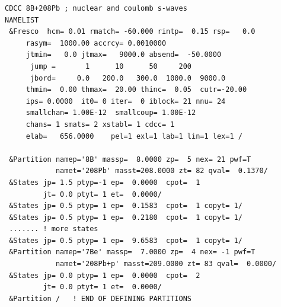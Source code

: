 \documentclass[11pt]{book}
\begin{document}
\begin{small} 
\begin{lstlisting}[frame=single]
CDCC 8B+208Pb ; nuclear and coulomb s-waves                                                    
NAMELIST
 &Fresco  hcm= 0.01 rmatch= -60.000 rintp=  0.15 rsp=   0.0
     rasym=  1000.00 accrcy= 0.0010000 
     jtmin=   0.0 jtmax=   9000.0 absend=  -50.0000 
      jump =       1      10      50     200     
      jbord=     0.0   200.0   300.0  1000.0  9000.0   
     thmin=  0.00 thmax=  20.00 thinc=  0.05  cutr=-20.00
     ips= 0.0000  it0= 0 iter=  0 iblock= 21 nnu= 24
     smallchan= 1.00E-12  smallcoup= 1.00E-12
     chans= 1 smats= 2 xstabl= 1 cdcc= 1
     elab=   656.0000    pel=1 exl=1 lab=1 lin=1 lex=1 /

 &Partition namep='8B' massp=  8.0000 zp=  5 nex= 21 pwf=T                
            namet='208Pb' masst=208.0000 zt= 82 qval=  0.1370/               
 &States jp= 1.5 ptyp=-1 ep=  0.0000  cpot=  1                                  
         jt= 0.0 ptyt= 1 et=  0.0000/                                           
 &States jp= 0.5 ptyp= 1 ep=  0.1583  cpot=  1 copyt= 1/                                                              
 &States jp= 0.5 ptyp= 1 ep=  0.2180  cpot=  1 copyt= 1/                                                              
 ....... ! more states
 &States jp= 0.5 ptyp= 1 ep=  9.6583  cpot=  1 copyt= 1/                                                              
 &Partition namep='7Be' massp=  7.0000 zp=  4 nex= -1 pwf=T                
            namet='208Pb+p' masst=209.0000 zt= 83 qval=  0.0000/               
 &States jp= 0.0 ptyp= 1 ep=  0.0000  cpot=  2                                  
         jt= 0.0 ptyt= 1 et=  0.0000/                                           
 &Partition /   ! END OF DEFINING PARTITIONS                                    
                                                                                

\end{lstlisting}
\end{small}
\end{document}
